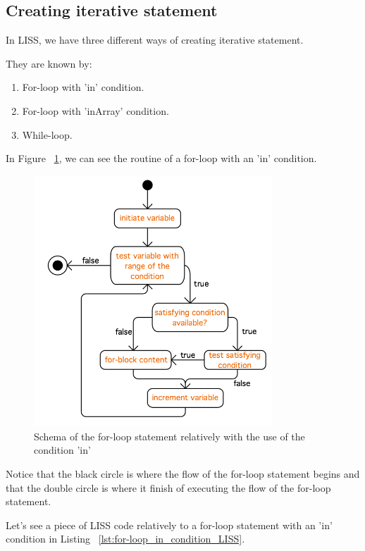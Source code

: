 \documentclass[
  oneside,
  11pt, a4paper,
  footinclude=true,
  headinclude=true,
  cleardoublepage=empty
]{scrbook}
\begin{document}
\subsection{Creating iterative statement}

In LISS, we have three different ways of creating iterative statement. 

They are known by:

\begin{enumerate}
\item For-loop with 'in' condition.
\item For-loop with 'inArray' condition.
\item While-loop.
\end{enumerate}

In Figure ~\ref{fig:for-loop_in}, we can see the routine of a for-loop with an 'in' condition.

\begin{figure}[h!]
  \centering
    \includegraphics[width=0.8\textwidth]{img/for-loop_in.png}
    \caption{Schema of the for-loop statement relatively with the use of the condition 'in'}
    \label{fig:for-loop_in}
\end{figure}

Notice that the black circle is where the flow of the for-loop statement begins and that the double circle is where it finish of executing the flow of the for-loop statement.

Let's see a piece of LISS code relatively to a for-loop statement with an 'in' condition in Listing ~\ref{lst:for-loop_in_condition_LISS}.
\end{document}
